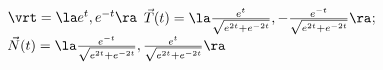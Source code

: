 {$\vrt = \la e^t,e^{-t} \ra$
}
{$\vec T(t) = \la \frac{e^t}{\sqrt{e^{2t}+e^{-2t}}},-\frac{e^{-t}}{\sqrt{e^{2t}+e^{-2t}}}\ra$; $\vec N(t) = \la \frac{e^{-t}}{\sqrt{e^{2t}+e^{-2t}}},\frac{e^{t}}{\sqrt{e^{2t}+e^{-2t}}}\ra$
}